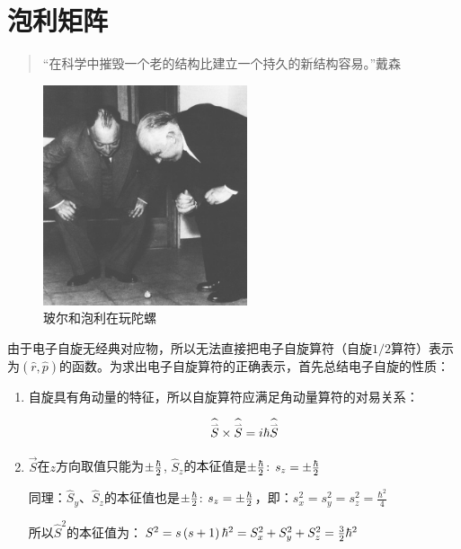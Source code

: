 \section{泡利矩阵}

\begin{quotation}
``在科学中摧毁一个老的结构比建立一个持久的新结构容易。''\qquad 戴森
\end{quotation}


\begin{figure}[h]
\begin{center}
\includegraphics[clip,width=6cm]{Spin/bohrandpauli.jpg}
\caption{玻尔和泡利在玩陀螺}
\end{center}
\end{figure}


由于电子自旋无经典对应物，所以无法直接把电子自旋算符（自旋$1/2$算符）表示为$\left( {\widehat r,\widehat p} \right)$的函数。为求出电子自旋算符的正确表示，首先总结电子自旋的性质：


\begin{enumerate}
    \item 自旋具有角动量的特征，所以自旋算符应满足角动量算符的对易关系：

\begin{equation}\label{28-3}
\widehat{\mathord{\buildrel{\lower3pt\hbox{$\scriptscriptstyle\rightharpoonup$}}
\over S} } \times \widehat{\mathord{\buildrel{\lower3pt\hbox{$\scriptscriptstyle\rightharpoonup$}}
\over S} } = i\hbar \widehat{\mathord{\buildrel{\lower3pt\hbox{$\scriptscriptstyle\rightharpoonup$}}
\over S} }
\end{equation}


    \item $\vec S$在$z$方向取值只能为$ \pm {\textstyle{\hbar  \over 2}}$, $\hat S_z$的本征值是$ \pm {\textstyle{\hbar  \over 2}}$: $s_z  =  \pm {\textstyle{\hbar  \over 2}}$

同理：$\hat S_y$、$\hat S_z$的本征值也是$ \pm {\textstyle{\hbar  \over 2}}$: $s_z  =  \pm {\textstyle{\hbar  \over 2}}$，即：$s_x^2  = s_y^2  = s_z^2  = \frac{{\hbar ^2 }}{4}$


所以$\hat S^2$的本征值为：$S^2  = s\left( {s + 1} \right)\hbar ^2  = S_x^2  + S_y^2  + S_z^2  = {\textstyle{3 \over 2}}\hbar ^2 $
   \end{enumerate}


